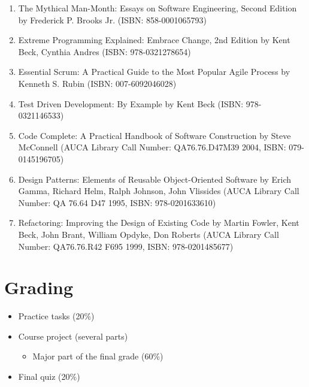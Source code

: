 \documentclass[12pt,a4paper,oneside]{article}
\begin{document}
            \begin{enumerate}
                \item The Mythical Man-Month: Essays on Software Engineering,
                Second Edition by Frederick P. Brooks Jr.  (ISBN:
                858-0001065793)
                \item Extreme Programming Explained: Embrace Change, 2nd Edition
                by Kent Beck, Cynthia Andres (ISBN: 978-0321278654)
                \item Essential Scrum: A Practical Guide to the Most Popular
                Agile Process by Kenneth S. Rubin (ISBN: 007-6092046028)
                \item Test Driven Development: By Example by Kent Beck (ISBN:
                978-0321146533)
                \item Code Complete: A Practical Handbook of Software
                Construction by Steve McConnell (AUCA Library Call Number:
                QA76.76.D47M39 2004, ISBN: 079-0145196705)
                \item Design Patterns: Elements of Reusable Object-Oriented
                Software by Erich Gamma, Richard Helm, Ralph Johnson, John
                Vlissides (AUCA Library Call Number: QA 76.64 D47 1995, ISBN:
                978-0201633610)
                \item Refactoring: Improving the Design of Existing Code by
                Martin Fowler, Kent Beck, John Brant, William Opdyke, Don
                Roberts (AUCA Library Call Number: QA76.76.R42 F695 1999, ISBN:
                978-0201485677)
            \end{enumerate}

    \section{Grading}

        \begin{itemize}
            \item Practice tasks (20\%)
            \item Course project (several parts)
            \begin{itemize}
                \item Major part of the final grade (60\%)
            \end{itemize}
            \item Final quiz (20\%)
        \end{itemize}
\end{document}
